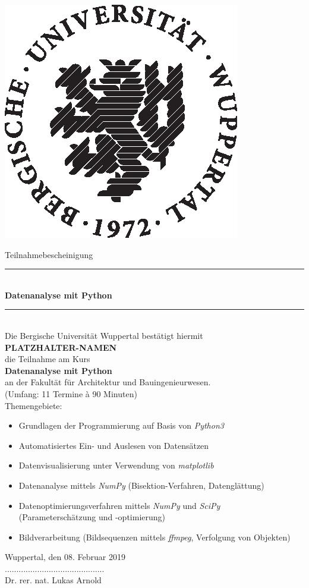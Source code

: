 \documentclass[11pt, a4paper]{article}
\begin{document}
\begin{center}
\thispagestyle{empty}
\includegraphics[scale=0.7]{siegel_buw.eps}
\vspace{0.5cm}

\huge Teilnahmebescheinigung \\[-0.5cm]
\rule{\linewidth}{0.2pt}\\[0.2cm]
{\Huge \textbf{Datenanalyse mit Python}}\\[-0.4cm]
\rule{\linewidth}{0.2pt}\\[1cm]
\Large
Die Bergische Universität Wuppertal bestätigt hiermit\\[0.5cm]
\textbf{\LARGE PLATZHALTER-NAMEN}\\[0.5cm]
die Teilnahme am Kurs\\
\textbf{Datenanalyse mit Python}\\
an der Fakultät für Architektur und Bauingenieurwesen.\\
(Umfang: 11 Termine à 90 Minuten)\\
\vspace{1cm}
\large
Themengebiete:
\begin{itemize}
\setlength\itemsep{0pt}
\item Grundlagen der Programmierung auf Basis von \textit{Python3}
\item Automatisiertes Ein- und Auslesen von Datensätzen
\item Datenvisualisierung unter Verwendung von \textit{matplotlib}
\item Datenanalyse mittels \textit{NumPy} (Bisektion-Verfahren, Datenglättung) 
\item Datenoptimierungsverfahren mittels \textit{NumPy} und \textit{SciPy}\\
(Parameterschätzung und -optimierung)
\item Bildverarbeitung (Bildsequenzen mittels \textit{ffmpeg}, Verfolgung von Objekten) 
\end{itemize}
\end{center}

\vspace{1.3cm}
Wuppertal, den 08. Februar 2019\\[1.2cm]
%
...........................................\\
Dr. rer. nat. Lukas Arnold
\end{document}
